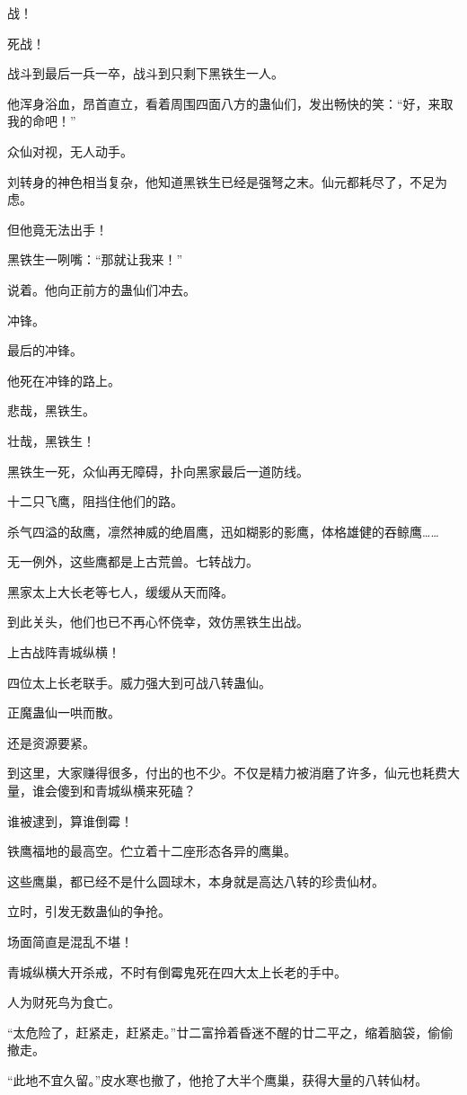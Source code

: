 \begin{this_body}
战！

死战！

战斗到最后一兵一卒，战斗到只剩下黑铁生一人。

他浑身浴血，昂首直立，看着周围四面八方的蛊仙们，发出畅快的笑：“好，来取我的命吧！”

众仙对视，无人动手。

刘转身的神色相当复杂，他知道黑铁生已经是强弩之末。仙元都耗尽了，不足为虑。

但他竟无法出手！

黑铁生一咧嘴：“那就让我来！”

说着。他向正前方的蛊仙们冲去。

冲锋。

最后的冲锋。

他死在冲锋的路上。

悲哉，黑铁生。

壮哉，黑铁生！

黑铁生一死，众仙再无障碍，扑向黑家最后一道防线。

十二只飞鹰，阻挡住他们的路。

杀气四溢的敌鹰，凛然神威的绝眉鹰，迅如糊影的影鹰，体格雄健的吞鲸鹰……

无一例外，这些鹰都是上古荒兽。七转战力。

黑家太上大长老等七人，缓缓从天而降。

到此关头，他们也已不再心怀侥幸，效仿黑铁生出战。

上古战阵青城纵横！

四位太上长老联手。威力强大到可战八转蛊仙。

正魔蛊仙一哄而散。

还是资源要紧。

到这里，大家赚得很多，付出的也不少。不仅是精力被消磨了许多，仙元也耗费大量，谁会傻到和青城纵横来死磕？

谁被逮到，算谁倒霉！

铁鹰福地的最高空。伫立着十二座形态各异的鹰巢。

这些鹰巢，都已经不是什么圆球木，本身就是高达八转的珍贵仙材。

立时，引发无数蛊仙的争抢。

场面简直是混乱不堪！

青城纵横大开杀戒，不时有倒霉鬼死在四大太上长老的手中。

人为财死鸟为食亡。

“太危险了，赶紧走，赶紧走。”廿二富拎着昏迷不醒的廿二平之，缩着脑袋，偷偷撤走。

“此地不宜久留。”皮水寒也撤了，他抢了大半个鹰巢，获得大量的八转仙材。


\end{this_body}
